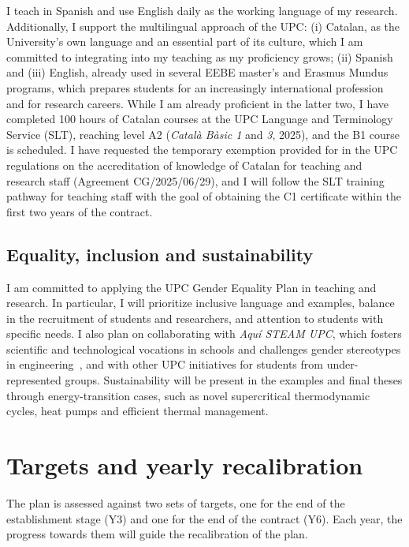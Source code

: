 \documentclass[11pt]{article}
\newcommand{\NEW}[1]{\iffinal #1\else{\color{red}#1}\fi}
\begin{document}
I teach in Spanish and use English daily as the working language of my research. 
Additionally, I support the multilingual approach of the UPC: (i) Catalan, as the University's own language and an essential part of its culture, which I am committed to integrating into my teaching as my proficiency grows; (ii) Spanish and (iii) English, already used in several EEBE master's and Erasmus Mundus programs, which prepares students for an increasingly international profession and for research careers.
While I am already \NEW{proficient} in the latter two, I have completed 100 hours of Catalan courses at the UPC Language and Terminology Service (SLT), reaching level A2 (\textit{Catal\`a B\`asic 1} and \textit{3}, 2025), and the B1 course is scheduled. 
I have requested the temporary exemption provided for in the UPC regulations on the accreditation of knowledge of Catalan for teaching and research staff (Agreement CG/2025/06/29), and I will follow the SLT training pathway for teaching staff with the goal of obtaining the C1 certificate within the first two years of the contract. 

\subsection{Equality, inclusion and sustainability}
I am committed to applying the UPC Gender Equality Plan in teaching and research.
In particular, I will prioritize inclusive language and examples, balance in the recruitment of students and researchers, and attention to students with specific needs. I also plan on collaborating with \textit{Aqu\'i STEAM UPC}, which fosters scientific and technological vocations in schools and challenges gender stereotypes in engineering~\cite{AquiSTEAM}, and with other UPC initiatives for students from under-represented groups.
Sustainability will be present in the examples and final theses through energy-transition cases, such as novel supercritical thermodynamic cycles, heat pumps and efficient thermal management.

\section{Targets and yearly recalibration}\label{sec:targets}

The plan is assessed against two sets of targets, one for the end of the establishment stage (Y3) and one for the end of the contract \NEW{(Y6)}. 
Each year, the progress \NEW{towards them} will guide the recalibration of the plan.
\end{document}
